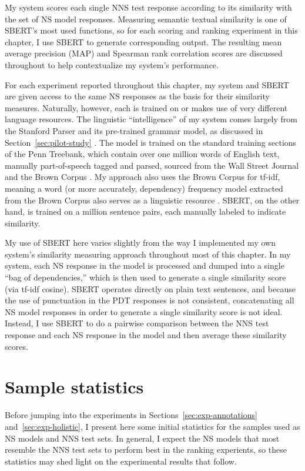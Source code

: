 My system scores each single NNS test response according to its similarity with the set of NS model responses. Measuring semantic textual similarity is one of SBERT's most used functions, so for each scoring and ranking experiment in this chapter, I use SBERT to generate corresponding output. The resulting mean average precision (MAP) and Spearman rank correlation scores are discussed throughout to help contextualize my system's performance.

For each experiment reported throughout this chapter, my system and SBERT are given access to the same NS responses as the basis for their similarity measures. Naturally, however, each is trained on or makes use of very different language resources. The linguistic ``intelligence'' of my system comes largely from the Stanford Parser and its pre-trained grammar model, as discussed in Section~\ref{sec:pilot-study} \cite{klein:manning:03}. The model is trained on the standard training sections of the Penn Treebank, which contain over one million words of English text, manually part-of-speech tagged and parsed, sourced from the Wall Street Journal and the Brown Corpus \cite{marcus-et-al:93}. My approach also uses the Brown Corpus for tf-idf, meaning a word (or more accurately, dependency) frequency model extracted from the Brown Corpus also serves as a linguistic resource \cite{kucera:francis:67}. SBERT, on the other hand, is trained on a million sentence pairs, each manually labeled to indicate similarity.

My use of SBERT here varies slightly from the way I implemented my own system's similarity measuring approach throughout most of this chapter. In my system, each NS response in the model is processed and dumped into a single ``bag of dependencies,'' which is then used to generate a single similarity score (via tf-idf cosine). SBERT operates directly on plain text sentences, and because the use of punctuation in the PDT responses is not consistent, concatenating all NS model responses in order to generate a single similarity score is not ideal. Instead, I use SBERT to do a pairwise comparison between the NNS test response and each NS response in the model and then average these similarity scores.


\section{Sample statistics}
\label{sec:sample-stats}
Before jumping into the experiments in Sections~\ref{sec:exp-annotations} and~\ref{sec:exp-holistic}, I present here some initial statistics for the samples used as NS models and NNS test sets. In general, I expect the NS models that most resemble the NNS test sets to perform best in the ranking experients, so these statistics may shed light on the experimental results that follow.

